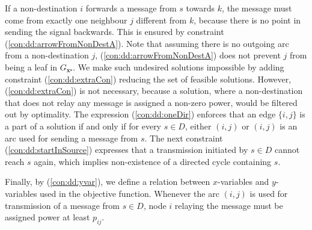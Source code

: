 If a non-destination $i$ forwards a message from $s$ towards $k$, the message must come from exactly one neighbour $j$ different from $k$, because there is no point in sending the signal backwards. This is ensured by constraint (\ref{con:dd:arrowFromNonDestA}). Note that assuming there is no outgoing arc from a non-destination $j$, (\ref{con:dd:arrowFromNonDestA}) does not prevent $j$ from being a leaf in $G_{\mathbf{x^s}}$. We make such undesired solutions impossible by adding constraint (\ref{con:dd:extraCon}) reducing the set of feasible solutions. However, (\ref{con:dd:extraCon}) is not necessary, because a solution, where a non-destination that does not relay any message is assigned a non-zero power, would be filtered out by optimality. The expression (\ref{con:dd:oneDir}) enforces that an edge $\{i,j\}$ is a part of a solution if and only if for every $s\in D$, either $(i,j)$ or $(i,j)$ is an arc used for sending a message from $s$. The next constraint (\ref{con:dd:startInSource}) expresses that a transmission initiated by $s\in D$ cannot reach $s$ again, which implies non-existence of a directed cycle containing $s$. 

Finally, by (\ref{con:dd:yvar}), we define a relation between $x$-variables and $y$-variables used in the objective function. Whenever the arc $(i,j)$ is used for transmission of a message from $s\in D$, node $i$ relaying the message must be assigned power at least $p_{ij}$.

